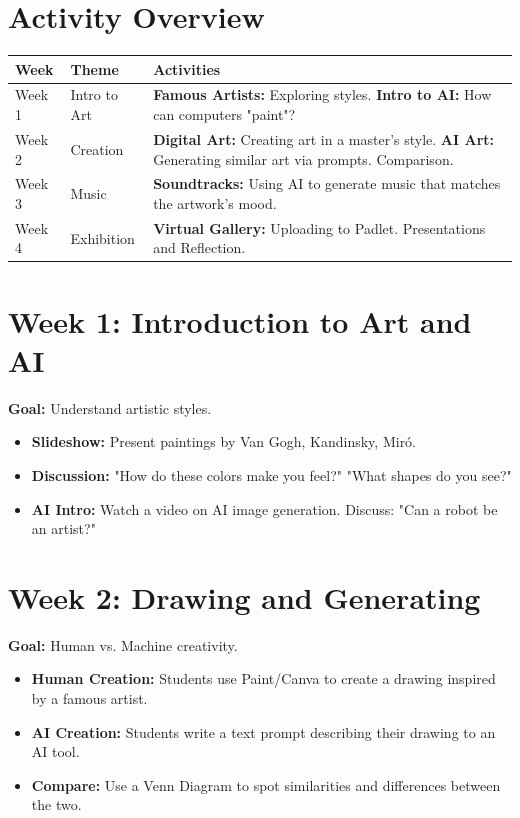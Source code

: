 \documentclass[11pt, a4paper]{article}
\begin{document}
\section*{Activity Overview}
\begingroup
\small
\begin{tabularx}{\textwidth}{|l|l|L|}
    \hline
     \textbf{Week} & \textbf{Theme} & \textbf{Activities} \\ \hline
    Week 1 & Intro to Art & \textbf{Famous Artists:} Exploring styles. \textbf{Intro to AI:} How can computers "paint"? \\ \hline
    Week 2 & Creation & \textbf{Digital Art:} Creating art in a master's style. \textbf{AI Art:} Generating similar art via prompts. Comparison. \\ \hline
    Week 3 & Music & \textbf{Soundtracks:} Using AI to generate music that matches the artwork's mood. \\ \hline
    Week 4 & Exhibition & \textbf{Virtual Gallery:} Uploading to Padlet. Presentations and Reflection. \\ \hline
\end{tabularx}
\endgroup

\section{Week 1: Introduction to Art and AI}
\textbf{Goal:} Understand artistic styles.
\begin{itemize}
    \item \textbf{Slideshow:} Present paintings by Van Gogh, Kandinsky, Miró.
    \item \textbf{Discussion:} "How do these colors make you feel?" "What shapes do you see?"
    \item \textbf{AI Intro:} Watch a video on AI image generation. Discuss: "Can a robot be an artist?"
\end{itemize}

\section{Week 2: Drawing and Generating}
\textbf{Goal:} Human vs. Machine creativity.
\begin{itemize}
    \item \textbf{Human Creation:} Students use Paint/Canva to create a drawing inspired by a famous artist.
    \item \textbf{AI Creation:} Students write a text prompt describing their drawing to an AI tool.
    \item \textbf{Compare:} Use a Venn Diagram to spot similarities and differences between the two.
\end{itemize}
\end{document}
